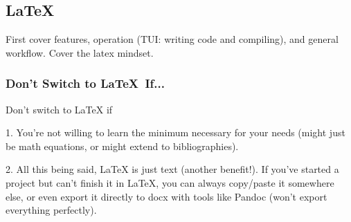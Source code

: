 \documentclass[12pt]{article}
\begin{document}



\subsection{\LaTeX}%
\label{feat-comp.latex}


First cover features, operation (TUI: writing code and compiling), and general workflow. Cover the latex mindset.

\subsubsection{Don't Switch to \LaTeX\ If...}%
\label{feat-comp.latex.don't-switch}

Don't switch to LaTeX if

1. You're not willing to learn the minimum necessary for your needs (might just be math equations, or might extend to bibliographies).

2. All this being said, LaTeX is just text (another benefit!). If you've started a project but can't finish it in LaTeX, you can always copy/paste it somewhere else, or even export it directly to docx with tools like Pandoc (won't export everything perfectly).
\end{document}
